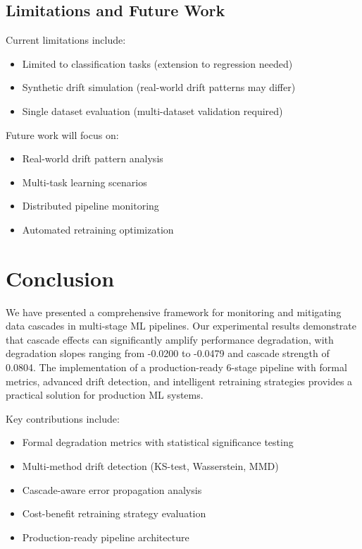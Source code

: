 \documentclass{article}
\begin{document}
\subsection{Limitations and Future Work}

Current limitations include:
\begin{itemize}
    \item Limited to classification tasks (extension to regression needed)
    \item Synthetic drift simulation (real-world drift patterns may differ)
    \item Single dataset evaluation (multi-dataset validation required)
\end{itemize}

Future work will focus on:
\begin{itemize}
    \item Real-world drift pattern analysis
    \item Multi-task learning scenarios
    \item Distributed pipeline monitoring
    \item Automated retraining optimization
\end{itemize}

\section{Conclusion}

We have presented a comprehensive framework for monitoring and mitigating data cascades in multi-stage ML pipelines. Our experimental results demonstrate that cascade effects can significantly amplify performance degradation, with degradation slopes ranging from -0.0200 to -0.0479 and cascade strength of 0.0804. The implementation of a production-ready 6-stage pipeline with formal metrics, advanced drift detection, and intelligent retraining strategies provides a practical solution for production ML systems.

Key contributions include:
\begin{itemize}
    \item Formal degradation metrics with statistical significance testing
    \item Multi-method drift detection (KS-test, Wasserstein, MMD)
    \item Cascade-aware error propagation analysis
    \item Cost-benefit retraining strategy evaluation
    \item Production-ready pipeline architecture
\end{itemize}
\end{document}
